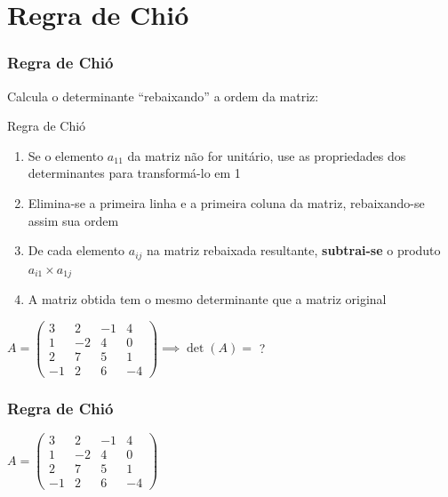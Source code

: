 \documentclass[pdftex, brazil, aspectratio=169]{beamer}
\begin{document}
\section{Regra de Chió}

\begin{frame}[t]
  \frametitle{Regra de Chió}
  Calcula o determinante ``rebaixando'' a ordem da matriz:
  \begin{block}{Regra de Chió}
    \begin{enumerate}
      \item Se o elemento $a_{11}$ da matriz não for unitário, use as
        propriedades dos determinantes para transformá-lo em 1
      \item Elimina-se a primeira linha e a primeira coluna da matriz,
        rebaixando-se assim sua ordem
      \item De cada elemento $a_{ij}$ na matriz rebaixada resultante,
        \textbf{subtrai-se} o produto $a_{i1} \times a_{1j}$
      \item A matriz obtida tem o mesmo determinante que a matriz original
    \end{enumerate}
  \end{block}
  $A = \begin{pmatrix}
    3 & 2 & -1 & 4\\
    1 & -2 & 4 & 0\\
    2 & 7 & 5 & 1\\
    -1 & 2 & 6 & -4\end{pmatrix} \implies \det(A) = $ ?
\end{frame}

\begin{frame}[t]
  \frametitle{Regra de Chió}
  $A = \begin{pmatrix}
    3 & 2 & -1 & 4\\
    1 & -2 & 4 & 0\\
    2 & 7 & 5 & 1\\
    -1 & 2 & 6 & -4\end{pmatrix}$
\end{frame}




\end{document}
